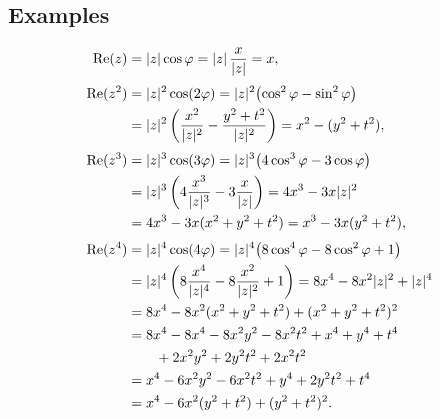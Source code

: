 \documentclass[11pt,a4paper]{article}
\DeclareMathOperator{\Real}{Re}
\DeclarePairedDelimiter{\abs}{\lvert}{\rvert}
\begin{document}
\subsection*{Examples}
\begingroup
\setlength{\jot}{3pt}
\begin{align*}
  \Real(z)
    &=\abs{z}\cos\varphi
     =\abs{z}\,\frac{x}{\abs{z}}=x,\\[3pt]
  \Real(z^2)
    &=\abs{z}^2\cos(2\varphi)
     =\abs{z}^2\bigl(\cos^2\varphi-\sin^2\varphi\bigr)\\
    &=\abs{z}^2\left(\frac{x^2}{\abs{z}^2}
       -\frac{y^2+t^2}{\abs{z}^2}\right)
     =x^2-(y^2+t^2),\\[3pt]
  \Real(z^3)
    &=\abs{z}^3\cos(3\varphi)
     =\abs{z}^3\bigl(4\cos^3\varphi-3\cos\varphi\bigr)\\
    &=\abs{z}^3\left(4\frac{x^3}{\abs{z}^3}
       -3\frac{x}{\abs{z}}\right)
     =4x^3-3x\abs{z}^2\\
    &=4x^3-3x(x^2+y^2+t^2)
     =x^3-3x(y^2+t^2),\\[3pt]
  \Real(z^4)
    &=\abs{z}^4\cos(4\varphi)
     =\abs{z}^4\bigl(8\cos^4\varphi-8\cos^2\varphi+1\bigr)\\
    &=\abs{z}^4\left(8\frac{x^4}{\abs{z}^4}
       -8\frac{x^2}{\abs{z}^2}+1\right)
     =8x^4-8x^2\abs{z}^2+\abs{z}^4\\
    &=8x^4-8x^2(x^2+y^2+t^2)+(x^2+y^2+t^2)^2\\
    &=8x^4-8x^4-8x^2y^2-8x^2t^2+x^4+y^4+t^4\\
    &\qquad+2x^2y^2+2y^2t^2+2x^2t^2\\
    &=x^4-6x^2y^2-6x^2t^2+y^4+2y^2t^2+t^4\\
    &=x^4-6x^2(y^2+t^2)+(y^2+t^2)^2.
\end{align*}
\endgroup
\end{document}
